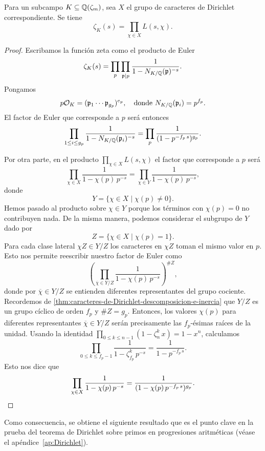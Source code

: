 \begin{teorema}
  Para un subcampo $K \subseteq \mathbb{Q} (\zeta_m)$, sea $X$ el grupo de caracteres
  de Dirichlet correspondiente. Se tiene
  $$\zeta_K (s) = \prod_{\chi\in X} L (s,\chi).$$

  \begin{proof}
    Escribamos la función zeta como el producto de Euler
    $$\zeta_K (s) = \prod_p \prod_{\mathfrak{p}\mid p} \frac{1}{1 - N_{K/\mathbb{Q}} (\mathfrak{p})^{-s}}.$$
    Pongamos
    \[ p\mathcal{O}_K = (\mathfrak{p}_1\cdots\mathfrak{p}_{g_p})^{e_p},
       \quad \text{donde }
       N_{K/\mathbb{Q}} (\mathfrak{p}_i) = p^{f_p}. \]
    El factor de Euler que corresponde a $p$ será entonces
    \[ \prod_{1 \le i \le g_p} \frac{1}{1 - N_{K/\mathbb{Q}} (\mathfrak{p}_i)^{-s}} =
       \prod_p \frac{1}{(1 - p^{-f_p \,s})^{g_p}}. \]

    Por otra parte, en el producto $\prod_{\chi\in X} L (s,\chi)$ el factor que
    corresponde a $p$ será
    \[ \prod_{\chi\in X} \frac{1}{1 - \chi (p)\,p^{-s}} =
       \prod_{\chi\in Y} \frac{1}{1 - \chi (p)\,p^{-s}}, \]
    donde
    $$Y = \{ \chi \in X \mid \chi (p) \ne 0 \}.$$
    Hemos pasado al producto sobre $\chi \in Y$ porque los términos con
    $\chi (p) = 0$ no contribuyen nada. De la misma manera, podemos considerar
    el subgrupo de $Y$ dado por
    $$Z = \{ \chi \in X \mid \chi (p) = 1 \}.$$
    Para cada clase lateral $\chi Z \in Y/Z$ los caracteres en $\chi Z$
    toman el mismo valor en $p$. Esto nos permite reescribir nuestro
    factor de Euler como
    $$\left(\prod_{\overline{\chi}\in Y/Z} \frac{1}{1 - \chi (p)\,p^{-s}}\right)^{\# Z},$$
    donde por $\overline{\chi}\in Y/Z$ se entienden diferentes representantes
    del grupo cociente. Recordemos de
    \ref{thm:caracteres-de-Dirichlet-descomposicion-e-inercia} que $Y/Z$ es un
    grupo cíclico de orden $f_p$ y $\# Z = g_p$. Entonces, los valores
    $\chi (p)$ para diferentes representantes $\overline{\chi} \in Y/Z$ serán
    precisamente las $f_p$-ésimas raíces de la unidad. Usando la identidad
    $\prod_{0 \le k \le n-1} (1 - \zeta_n^k\,x) = 1 - x^n$, calculamos
    $$\prod_{0 \le k \le f_p-1} \frac{1}{1 - \zeta_{f_p}^k\,p^{-s}} = \frac{1}{1 - p^{-f_p\,s}}.$$
    Esto nos dice que
    \[ \prod_{\chi\in X} \frac{1}{1 - \chi (p)\,p^{-s}} =
       \frac{1}{(1 - \chi (p)\,p^{-f_p\,s})^{g_p}}. \qedhere \]
  \end{proof}
\end{teorema}

Como consecuencia, se obtiene el siguiente resultado que es el punto clave en
la prueba del teorema de Dirichlet sobre primos en progresiones aritméticas
(véase el apéndice~\ref{ap:Dirichlet}).


